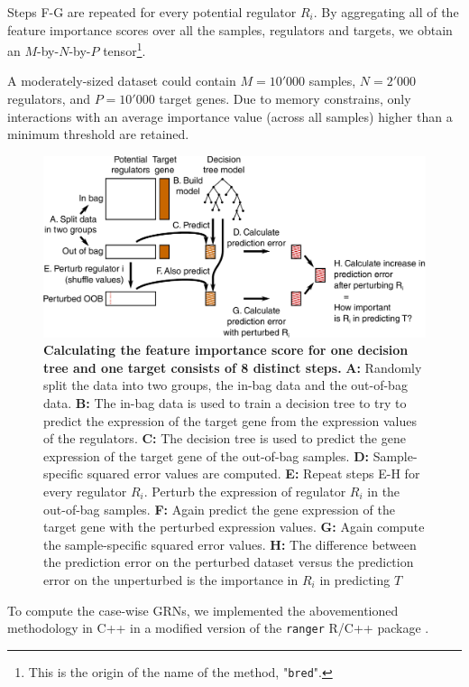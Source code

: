 Steps F-G are repeated for every potential regulator $R_i$. By aggregating all of the feature importance scores over all the samples, regulators and targets, we obtain an $M$-by-$N$-by-$P$ tensor\footnote{This is the origin of the name of the method, "\texttt{bred}".}. 

A moderately-sized dataset could contain $M=10'000$ samples, $N=2'000$ regulators, and $P=10'000$ target genes. Due to memory constrains, only interactions with an average importance value (across all samples) higher than a minimum threshold are retained.

\begin{figure}[htb!]
	\centering
	\includegraphics[width=.9\linewidth]{fig/methodology/fimp.pdf} 
	\caption{
		\textbf{Calculating the feature importance score for one decision tree and one target consists of 8 distinct steps.}
		\textbf{A:} Randomly split the data into two groups, the in-bag data and the out-of-bag data.
		\textbf{B:} The in-bag data is used to train a decision tree to try to predict the expression of the target gene from the expression values of the regulators.
		\textbf{C:} The decision tree is used to predict the gene expression of the target gene of the out-of-bag samples.
		\textbf{D:} Sample-specific squared error values are computed.
		\textbf{E:} Repeat steps E-H for every regulator $R_i$. Perturb the expression of regulator $R_i$ in the out-of-bag samples.
		\textbf{F:} Again predict the gene expression of the target gene with the perturbed expression values.
		\textbf{G:} Again compute the sample-specific squared error values.
		\textbf{H:} The difference between the prediction error on the perturbed dataset versus the prediction error on the unperturbed is the importance in $R_i$ in predicting $T$ 
	}
	\label{fig:fimp}
\end{figure}

To compute the case-wise GRNs, we implemented the abovementioned methodology in C++ in a modified version of the \texttt{ranger} R/C++ package \cite{wright_rangerfastimplementation_2017}.

